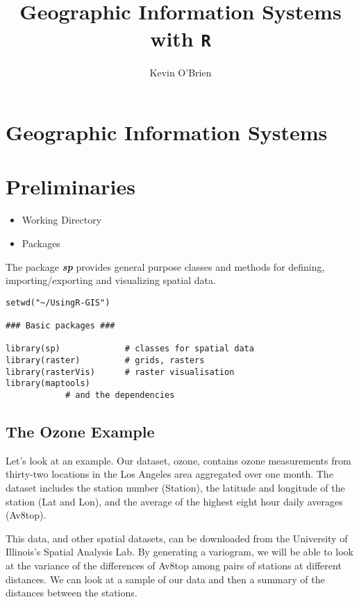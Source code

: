 \documentclass[11pt]{article} %
\title{Geographic Information Systems with \texttt{R}}
\author{Kevin O'Brien}
\begin{document}
\maketitle
\tableofcontents
\newpage
\section{Geographic Information Systems}



\section{Preliminaries}
\begin{itemize}
\item Working Directory
\item Packages
\end{itemize}

The package \textbf{\textit{sp}} provides general purpose classes and methods for defining, importing/exporting and visualizing spatial data.
\begin{framed}
\begin{verbatim}
setwd("~/UsingR-GIS")
 
### Basic packages ###
 
library(sp)             # classes for spatial data
library(raster)         # grids, rasters
library(rasterVis)      # raster visualisation
library(maptools)
			# and the dependencies
 \end{verbatim}
\end{framed}


\subsection{The Ozone Example}
Let's look at an example. Our dataset, ozone, contains ozone measurements from thirty-two locations in the Los Angeles area aggregated over one month. The dataset includes the station number (Station), the latitude and longitude of the station (Lat and Lon), and the average of the highest eight hour daily averages (Av8top). 

This data, and other spatial datasets, can be downloaded from the University of Illinois's Spatial Analysis Lab. By generating a variogram, we will be able to look at the variance of the differences of  Av8top among pairs of stations at different distances.  We can look at a sample of our data and then a summary of the distances between the stations.
\end{document}
